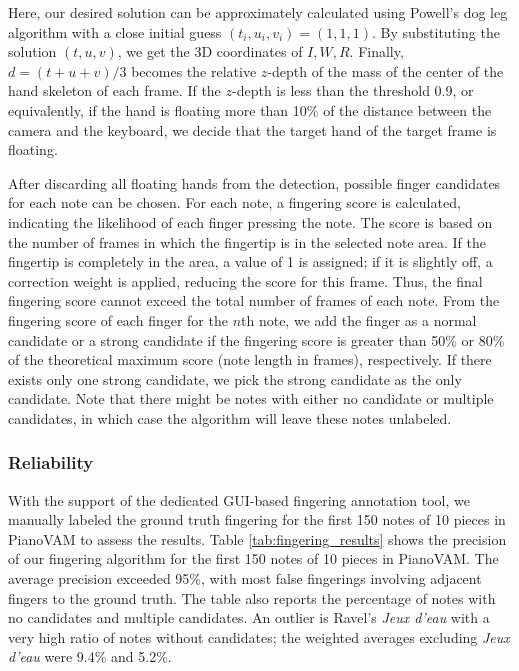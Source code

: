\documentclass{article}
\begin{document}
Here, our desired solution can be approximately calculated using Powell's dog leg algorithm with a close initial guess $(t_i,u_i,v_i)=(1,1,1)$. By substituting the solution $(t,u,v)$, we get the 3D coordinates of $I,W,R$.  Finally, $d=(t+u+v)/3$ becomes the relative $z$-depth of the mass of the center of the hand skeleton of each frame. If the $z$-depth is less than the threshold $0.9$, or equivalently, if the hand is floating more than 10\% of the distance between the camera and the keyboard, we decide that the target hand of the target frame is floating.



After discarding all floating hands from the detection, possible finger candidates for each note can be chosen. For each note, a fingering score is calculated, indicating the likelihood of each finger pressing the note. The score is based on the number of frames in which the fingertip is in the selected note area. If the fingertip is completely in the area, a value of 1 is assigned; if it is slightly off, a correction weight is applied, reducing the score for this frame. Thus, the final fingering score cannot exceed the total number of frames of each note. From the fingering score of each finger for the $n$th note, we add the finger as a normal candidate or a strong candidate if the fingering score is greater than 50\% or 80\% of the theoretical maximum score (note length in frames), respectively. If there exists only one strong candidate, we pick the strong candidate as the only candidate. Note that there might be notes with either no candidate or multiple candidates, in which case the algorithm will leave these notes unlabeled.

\subsubsection{Reliability}
With the support of the dedicated GUI-based fingering annotation tool, we manually labeled the ground truth fingering for the first 150 notes of 10 pieces in PianoVAM to assess the results. Table \ref{tab:fingering_results} shows the precision of our fingering algorithm for the first 150 notes of 10 pieces in PianoVAM. The average precision exceeded 95\%, with most false fingerings involving adjacent fingers to the ground truth. The table also reports the percentage of notes with no candidates and multiple candidates. %
An outlier is Ravel's \textit{Jeux d'eau} with a very high ratio of notes without candidates; the weighted averages excluding \textit{Jeux d'eau} were 9.4\% and 5.2\%.
\end{document}
